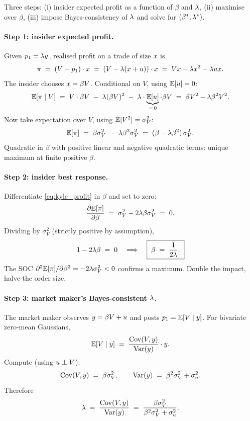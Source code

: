 Three steps: (i) insider expected profit as a function of $\beta$
and $\lambda$, (ii) maximise over $\beta$, (iii) impose
Bayes-consistency of $\lambda$ and solve for
$(\beta^\ast, \lambda^\ast)$.

\paragraph{Step 1: insider expected profit.}
Given $p_1 = \lambda y$, realised profit on a trade of size $x$ is
\[
  \pi \;=\; (V - p_1) \cdot x
  \;=\; (V - \lambda(x + u)) \cdot x
  \;=\; V x - \lambda x^2 - \lambda u x.
\]
The insider chooses $x = \beta V$. Conditional on $V$, using
$\mathbb{E}[u] = 0$:
\[
  \mathbb{E}[\pi \mid V]
  \;=\; V \cdot \beta V \;-\; \lambda (\beta V)^2 \;-\; \lambda \cdot \underbrace{\mathbb{E}[u]}_{=\,0} \cdot \beta V
  \;=\; \beta V^2 - \lambda \beta^2 V^2.
\]
Now take expectation over $V$, using $\mathbb{E}[V^2] = \sigma_V^2$:
\begin{equation}
  \mathbb{E}[\pi] \;=\; \beta \sigma_V^2 \;-\; \lambda \beta^2 \sigma_V^2
  \;=\; (\beta - \lambda \beta^2)\,\sigma_V^2.
  \label{eq:kyle_profit}
\end{equation}
Quadratic in $\beta$ with positive linear and negative quadratic
terms: unique maximum at finite positive $\beta$.

\paragraph{Step 2: insider best response.}
Differentiate \cref{eq:kyle_profit} in $\beta$ and set to zero:
\[
  \frac{\partial \mathbb{E}[\pi]}{\partial \beta}
  \;=\; \sigma_V^2 - 2 \lambda \beta \sigma_V^2 \;=\; 0.
\]
Dividing by $\sigma_V^2$ (strictly positive by assumption),
\[
  1 - 2 \lambda \beta \;=\; 0
  \quad\Longrightarrow\quad
  \boxed{\;\beta \;=\; \frac{1}{2\lambda}.\;}
\]
The SOC $\partial^2 \mathbb{E}[\pi]/\partial \beta^2 = -2 \lambda \sigma_V^2
< 0$ confirms a maximum. Double the impact, halve the order size.

\paragraph{Step 3: market maker's Bayes-consistent $\lambda$.}
The market maker observes $y = \beta V + u$ and posts $p_1 =
\mathbb{E}[V \mid y]$. For bivariate zero-mean Gaussians,
\[
  \mathbb{E}[V \mid y]
  \;=\; \frac{\operatorname{Cov}(V, y)}{\operatorname{Var}(y)} \cdot y.
\]
Compute (using $u \perp V$):
\[
  \operatorname{Cov}(V, y) \;=\; \beta \sigma_V^2,
  \qquad
  \operatorname{Var}(y) \;=\; \beta^2 \sigma_V^2 + \sigma_u^2.
\]
Therefore
\begin{equation}
  \lambda \;=\; \frac{\operatorname{Cov}(V, y)}{\operatorname{Var}(y)}
      \;=\; \frac{\beta \sigma_V^2}{\beta^2 \sigma_V^2 + \sigma_u^2}.
  \label{eq:kyle_mm}
\end{equation}

